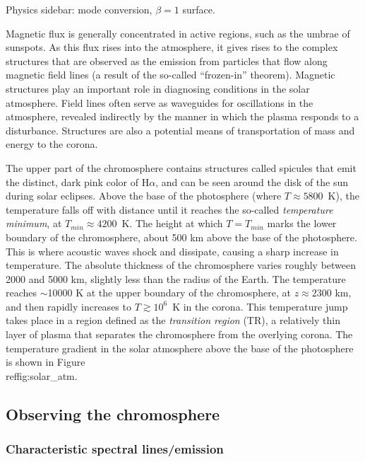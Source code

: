 \begin{framed}
    Physics sidebar: mode conversion, $\beta = 1$ surface.
\end{framed}

Magnetic flux is generally concentrated in active regions, such as the umbrae
of sunspots. As this flux rises into the atmosphere, it gives rises to the
complex structures that are observed as the emission from particles that flow
along magnetic field lines (a result of the so-called ``frozen-in'' theorem).
Magnetic structures play an important role in diagnosing conditions in the
solar atmosphere. Field lines often serve as waveguides for oscillations in the
atmosphere, revealed indirectly by the manner in which the plasma responds to a
disturbance. Structures are also a potential means of transportation of mass
and energy to the corona.


The upper part of
the chromosphere contains structures called spicules that emit the distinct,
dark pink color of H$\alpha$, and can be seen around the disk of the sun during
solar eclipses. Above the base of the photosphere (where $T \approx 5800$~K),
the temperature falls off with distance until it reaches the so-called
\textit{temperature minimum}, at $T_{min} \approx 4200$~K. The height at which
$T = T_{min}$ marks the lower boundary of the chromosphere, about 500 km above
the base of the photosphere. This is where acoustic waves shock and dissipate,
causing a sharp increase in temperature. The absolute thickness of the
chromosphere varies roughly between 2000 and 5000 km, slightly less than the
radius of the Earth. The temperature reaches $\sim$10000 K at the upper
boundary of the chromosphere, at $z \approx 2300$ km, and then rapidly
increases to $T\!\gtrsim\!10^{6}$~K in the corona.
This temperature jump takes
place in a region defined as the \textit{transition region} (TR), a relatively
thin layer of plasma that separates the chromosphere from the overlying corona.
The temperature gradient in the solar atmosphere above the base of the
photosphere is shown in
Figure~\\ref{fig:solar\_atm}.



\subsection{Observing the chromosphere}

\subsubsection{Characteristic spectral lines/emission}


